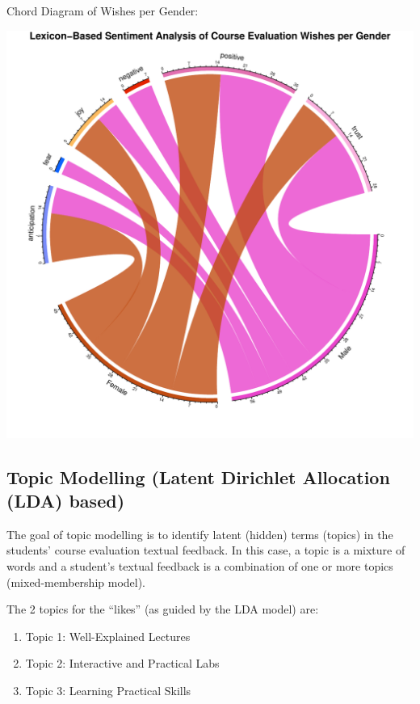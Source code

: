 \documentclass[
]{article}
\begin{document}
\newpage

Chord Diagram of Wishes per Gender:

\includegraphics{AnalysisOfCourseEvaluation-Notebook_files/figure-latex/ChordDiagramPerGender_Wishes-1.pdf}

\newpage

\subsection{Topic Modelling (Latent Dirichlet Allocation (LDA)
based)}\label{topic-modelling-latent-dirichlet-allocation-lda-based}

The goal of topic modelling is to identify latent (hidden) terms
(topics) in the students' course evaluation textual feedback. In this
case, a topic is a mixture of words and a student's textual feedback is
a combination of one or more topics (mixed-membership model).

The 2 topics for the ``likes'' (as guided by the LDA model) are:

\begin{enumerate}
\def\labelenumi{\arabic{enumi}.}
\item
  Topic 1: Well-Explained Lectures
\item
  Topic 2: Interactive and Practical Labs
\item
  Topic 3: Learning Practical Skills
\end{enumerate}
\end{document}
